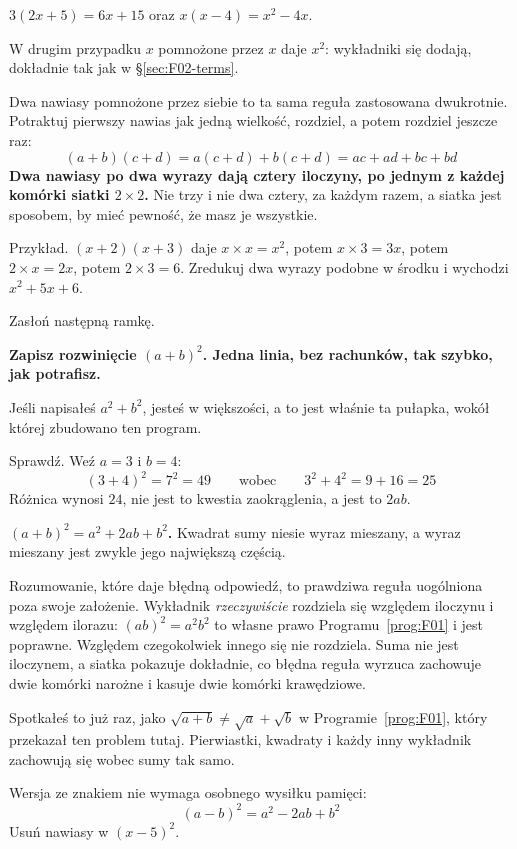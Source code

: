 \begin{fr}
\begin{ansblock}
$3(2x + 5) = 6x + 15$ \quad oraz \quad $x(x - 4) = x^{2} - 4x$.

W drugim przypadku $x$ pomnożone przez $x$ daje $x^{2}$: wykładniki się
dodają, dokładnie tak jak w \S\ref{sec:F02-terms}.
\end{ansblock}

Dwa nawiasy pomnożone przez siebie to ta sama reguła zastosowana dwukrotnie.
Potraktuj pierwszy nawias jak jedną wielkość, rozdziel, a potem rozdziel
jeszcze raz:
\[ (a + b)(c + d) = a(c + d) + b(c + d) = ac + ad + bc + bd \]
\textbf{Dwa nawiasy po dwa wyrazy dają cztery iloczyny, po jednym z każdej
komórki siatki $2 \times 2$.} Nie trzy i nie dwa \dash{} cztery, za każdym
razem, a siatka jest sposobem, by mieć pewność, że masz je wszystkie.

Przykład. $(x + 2)(x + 3)$ daje $x \times x = x^{2}$, potem
$x \times 3 = 3x$, potem $2 \times x = 2x$, potem $2 \times 3 = 6$. Zredukuj
dwa wyrazy podobne w środku i wychodzi $x^{2} + 5x + 6$.
\end{fr}

\begin{fr}
Zasłoń następną ramkę.

\textbf{Zapisz rozwinięcie $(a + b)^{2}$. Jedna linia, bez rachunków, tak
szybko, jak potrafisz.}
\dotline
\nextframe
\end{fr}

\begin{fr}
\begin{ansblock}
Jeśli napisałeś $a^{2} + b^{2}$, jesteś w większości, a to jest właśnie ta
pułapka, wokół której zbudowano ten program.

Sprawdź. Weź $a = 3$ i $b = 4$:
\[ (3 + 4)^{2} = 7^{2} = 49 \qquad \text{wobec} \qquad
   3^{2} + 4^{2} = 9 + 16 = 25 \]
Różnica wynosi $24$, nie jest to kwestia zaokrąglenia, a jest to $2ab$.
\end{ansblock}

\begin{trapbox}
\textbf{$(a+b)^{2} = a^{2} + 2ab + b^{2}$.} Kwadrat sumy niesie wyraz mieszany,
a wyraz mieszany jest zwykle jego największą częścią.

Rozumowanie, które daje błędną odpowiedź, to prawdziwa reguła uogólniona poza
swoje założenie. Wykładnik \emph{rzeczywiście} rozdziela się względem iloczynu
i względem ilorazu: $(ab)^{2} = a^{2}b^{2}$ to własne prawo
Programu~\ref{prog:F01} i jest poprawne. Względem czegokolwiek innego się nie
rozdziela. Suma nie jest iloczynem, a siatka pokazuje dokładnie, co błędna
reguła wyrzuca \dash{} zachowuje dwie komórki narożne i kasuje dwie komórki
krawędziowe.

Spotkałeś to już raz, jako $\sqrt{a + b} \ne \sqrt{a} + \sqrt{b}$ w
Programie~\ref{prog:F01}, który przekazał ten problem tutaj. Pierwiastki,
kwadraty i każdy inny wykładnik zachowują się wobec sumy tak samo.
\end{trapbox}
Wersja ze znakiem nie wymaga osobnego wysiłku pamięci:
\[ (a - b)^{2} = a^{2} - 2ab + b^{2} \]
Usuń nawiasy w $(x - 5)^{2}$.
\nextframe
\end{fr}

